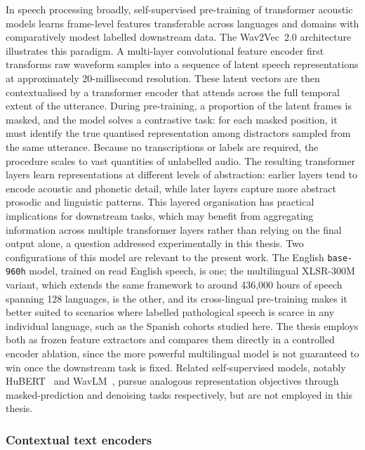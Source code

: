 In speech processing broadly, self-supervised pre-training of transformer acoustic models learns frame-level features transferable across languages and domains with comparatively modest labelled downstream data.
The Wav2Vec~2.0 architecture~\cite{baevski2020wav2vec} illustrates this paradigm.
A multi-layer convolutional feature encoder first transforms raw waveform samples into a sequence of latent speech representations at approximately 20-millisecond resolution.
These latent vectors are then contextualised by a transformer encoder that attends across the full temporal extent of the utterance.
During pre-training, a proportion of the latent frames is masked, and the model solves a contrastive task: for each masked position, it must identify the true quantised representation among distractors sampled from the same utterance.
Because no transcriptions or labels are required, the procedure scales to vast quantities of unlabelled audio.
The resulting transformer layers learn representations at different levels of abstraction: earlier layers tend to encode acoustic and phonetic detail, while later layers capture more abstract prosodic and linguistic patterns.
This layered organisation has practical implications for downstream tasks, which may benefit from aggregating information across multiple transformer layers rather than relying on the final output alone, a question addressed experimentally in this thesis.
Two configurations of this model are relevant to the present work. The English \texttt{base-960h} model, trained on read English speech, is one; the multilingual XLSR-300M variant, which extends the same framework to around 436{,}000 hours of speech spanning 128 languages, is the other, and its cross-lingual pre-training makes it better suited to scenarios where labelled pathological speech is scarce in any individual language, such as the Spanish cohorts studied here. The thesis employs both as frozen feature extractors and compares them directly in a controlled encoder ablation, since the more powerful multilingual model is not guaranteed to win once the downstream task is fixed.
Related self-supervised models, notably HuBERT~\cite{hsu2021hubert} and WavLM~\cite{chen2022wavlm}, pursue analogous representation objectives through masked-prediction and denoising tasks respectively, but are not employed in this thesis.

\subsubsection{Contextual text encoders}


